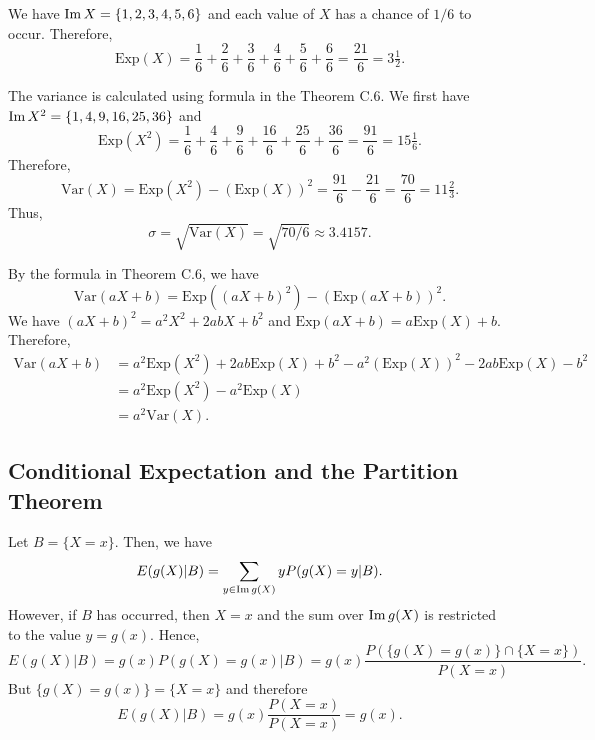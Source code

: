 \begin{problem}
We have $\operatorname{Im} X = \{ 1, 2, 3, 4, 5, 6 \}$ and each value of $X$ has a chance of $1/6$ to occur. Therefore,
\[
    \mathrm{Exp} (X) = \frac{1}{6} + \frac{2}{6} + \frac{3}{6} + \frac{4}{6} + \frac{5}{6} + \frac{6}{6} = \frac{21}{6}  = 3 \tfrac{1}{2} .
\]

The variance is calculated using formula in the Theorem C.6. We first have $\operatorname{Im} X^2 = \{ 1 , 4, 9, 16, 25, 36 \}$ and
\[
    \mathrm{Exp} (X^2) = \frac{1}{6} + \frac{4}{6} + \frac{9}{6} + \frac{16}{6} + \frac{25}{6} + \frac{36}{6} =  \frac{91}{6} = 15 \tfrac{1}{6} . 
\]
Therefore,
\[
    \mathrm{Var} (X) = \mathrm{Exp} (X^2) - (\mathrm{Exp} (X))^2 = \frac{91}{6} - \frac{21}{6} = \frac{70}{6} = 11 \tfrac{2}{3} .
\]
Thus,
\[
    \sigma = \sqrt{\mathrm{Var} (X)} = \sqrt{70/6} \approx 3.4157 . \tag*{$\triangle$}
\]
\end{problem}

\begin{problem}
By the formula in Theorem C.6, we have
\[
    \mathrm{Var} (aX + b) = \mathrm{Exp} ( (aX + b)^2) - (\mathrm{Exp} (aX +b))^2 .
\]
We have $(aX + b)^2 = a^2 X^2 + 2abX + b^2$ and $\mathrm{Exp} (aX + b) = a \mathrm{Exp} (X) + b$. Therefore,
\begin{align*}
\mathrm{Var} (aX + b) &= a^2 \mathrm{Exp} (X^2) + 2 ab \mathrm{Exp} (X) + b^2 - a^2 (\mathrm{Exp} (X))^2 - 2ab \mathrm{Exp} (X) - b^2 \\ 
&= a^2 \mathrm{Exp} (X^2) - a^2 \mathrm{Exp} (X) \\ 
&= a^2 \mathrm{Var} (X) . \tag*{$\triangle$}
\end{align*}
\end{problem}

\subsection{Conditional Expectation and the Partition Theorem}

\begin{problem}
Let $B = \{ X = x \}$. Then, we have
    \[
        E (g(X) | B) = \sum_{y \in \operatorname{Im} g (X)} y P (g (X) = y | B ) . 
    \]
However, if $B$ has occurred, then $X = x$ and the sum over $\operatorname{Im} g (X)$ is restricted to the value $y = g (x)$. Hence,
    \[
        E (g (X) | B) = g (x) P (g (X) = g(x) | B) = g (x) \frac{ P (\{ g (X) = g (x) \} \cap \{ X = x \} )}{P (X = x)} .
    \]
But $\{ g (X) = g (x) \} = \{ X = x \}$ and therefore
    \[
        E (g (X) | B) = g (x) \frac{P (X = x)}{P (X = x)} = g (x) . \tag*{$\triangle$}
    \]
\end{problem}

